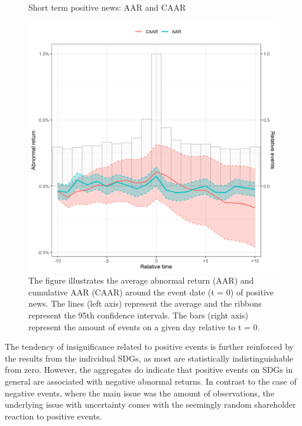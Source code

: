 \begin{figure} [H] 
    \centering
    \caption{Short term positive news: AAR and CAAR}
    \includegraphics[scale=0.6]{Projekt/1.Figures analysis/ST_positive_all_CI.png}
    \caption*{\footnotesize The figure illustrates the average abnormal return (AAR) and cumulative AAR (CAAR) around the event date (t = 0) of positive news. The lines (left axis) represent the average and the ribbons represent the 95th confidence intervals. The bars (right axis) represent the amount of events on a given day relative to t = 0. }
    \label{fig:ST_pos_news}
\end{figure}


The tendency of insignificance related to positive events is further reinforced by the results from the individual SDGs, as most are statistically indistinguishable from zero. However, the aggregates do indicate that positive events on SDGs in general are associated with negative abnormal returns. In contrast to the case of negative events, where the main issue was the amount of observations, the underlying issue with uncertainty comes with the seemingly random shareholder reaction to positive events. 
 

